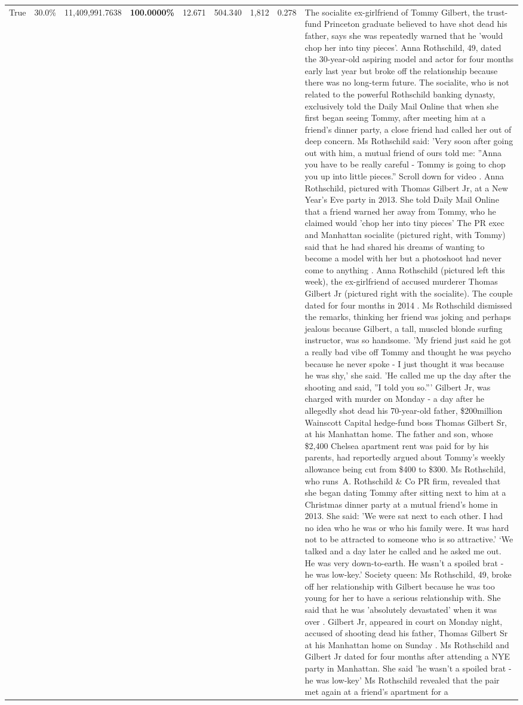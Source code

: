 \begin{table}[H]
\begin{tabular}{lllrlllll}
True & 30.0\% & 11,409,991.7638 & \bfseries \color{red} 100.0000\% & 12.671 & 504.340 & 1,812 & 0.278 & The socialite ex-girlfriend of Tommy Gilbert, the trust-fund Princeton graduate believed to have shot dead his father, says she was repeatedly warned that he 'would chop her into tiny pieces'. Anna Rothschild, 49, dated the 30-year-old aspiring model and actor for four months early last year but broke off the relationship because there was no long-term future. The socialite, who is not related to the powerful Rothschild banking dynasty, exclusively told the Daily Mail Online that when she first began seeing Tommy, after meeting him at a friend's dinner party, a close friend had called her out of deep concern. Ms Rothschild said: 'Very soon after going out with him, a mutual friend of ours told me: ''Anna you have to be really careful - Tommy is going to chop you up into little pieces.'' Scroll down for video . Anna Rothschild, pictured with Thomas Gilbert Jr, at a New Year's Eve party in 2013. She told Daily Mail Online that a friend warned her away from Tommy, who he claimed would 'chop her into tiny pieces' The PR exec and Manhattan socialite (pictured right, with Tommy) said that he had shared his dreams of wanting to become a model with her but a photoshoot had never come to anything . Anna Rothschild (pictured left this week), the ex-girlfriend of accused murderer Thomas Gilbert Jr (pictured right with the socialite). The couple dated for four months in 2014 . Ms Rothschild dismissed the remarks, thinking her friend was joking and perhaps jealous because Gilbert, a tall, muscled blonde surfing instructor, was so handsome. 'My friend just said he got a really bad vibe off Tommy and thought he was psycho because he never spoke - I just thought it was because he was shy,' she said. 'He called me up the day after the shooting and said, ''I told you so.''' Gilbert Jr, was charged with murder on Monday - a day after he allegedly shot dead his 70-year-old father, \$200million Wainscott Capital hedge-fund boss Thomas Gilbert Sr, at his Manhattan home. The father and son, whose \$2,400 Chelsea apartment rent was paid for by his parents, had reportedly argued about Tommy's weekly allowance being cut from \$400 to \$300. Ms Rothschild, who runs A. Rothschild \& Co PR firm, revealed that she began dating Tommy after sitting next to him at a Christmas dinner party at a mutual friend's home in 2013. She said: 'We were sat next to each other. I had no idea who he was or who his family were. It was hard not to be attracted to someone who is so attractive.' ‘We talked and a day later he called and he asked me out. He was very down-to-earth. He wasn’t a spoiled brat - he was low-key.’ Society queen: Ms Rothschild, 49, broke off her relationship with Gilbert because he was too young for her to have a serious relationship with. She said that he was 'absolutely devastated' when it was over . Gilbert Jr, appeared in court on Monday night, accused of shooting dead his father, Thomas Gilbert Sr at his Manhattan home on Sunday . Ms Rothschild and Gilbert Jr dated for four months after attending a NYE party in Manhattan. She said 'he wasn't a spoiled brat - he was low-key' Ms Rothschild revealed that the pair met again at a friend’s apartment for a 
\end{tabular}
\end{table}
